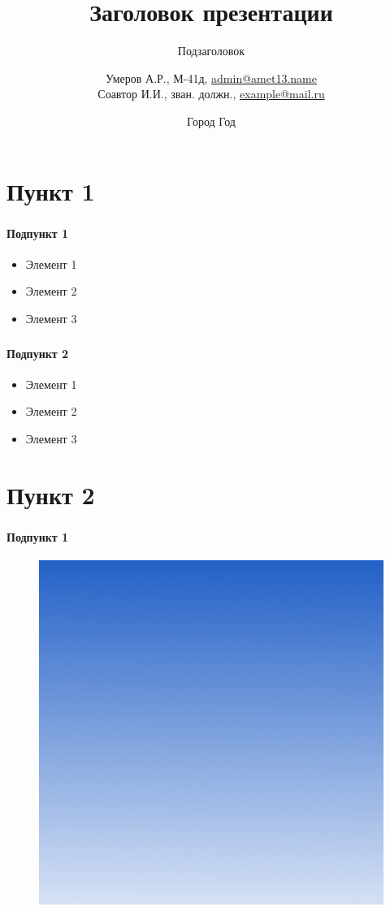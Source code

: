 \documentclass[xetex,mathserif,serif,t]{beamer} %
\title{Заголовок презентации}
\subtitle{Подзаголовок}
\author[Умеров А.\:Р. Соавтор И.\:И.]{
Умеров А.\:Р., М-41д,
\href{mailto:admin@amet13.name}{admin@amet13.name} \\
Соавтор И.\:И., зван. должн., \href{mailto:example@mail.ru}{example@mail.ru}
}
\date{Город Год}
\institute[ВУЗ]{Полное название ВУЗа}
\begin{document}
\frame[plain]{\titlepage} %


\section{Пункт 1}

\begin{frame}
\frametitle{\insertsection}
\framesubtitle{Подпункт 1}
\begin{itemize}
	\item Элемент 1
	\item Элемент 2
	\item Элемент 3
\end{itemize}
\end{frame}

\begin{frame}
\frametitle{\insertsection}
\framesubtitle{Подпункт 2}
\begin{itemize}
	\item Элемент 1
	\item Элемент 2
	\item Элемент 3
\end{itemize}
\end{frame}

\section{Пункт 2}

\begin{frame}
\frametitle{\insertsection}
\framesubtitle{Подпункт 1}
\begin{figure}[h]
	\begin{center}
		\includegraphics[width=0.5\linewidth]{main}
	 \end{center}
\end{figure}
\end{frame}
\end{document}
